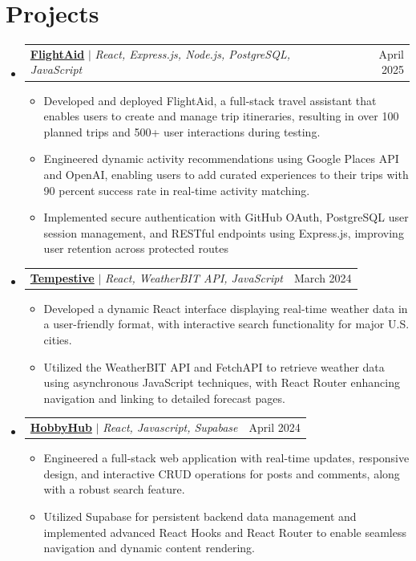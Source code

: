 \documentclass[letterpaper,11pt]{article}
\makeatletter
\newcommand{\resumeItem}[1]{
  \item\small{
    {#1 \vspace{-2pt}}
  }
}
\newcommand{\resumeProjectHeading}[2]{
    \item
    \begin{tabular*}{0.97\textwidth}{l@{\extracolsep{\fill}}r}
      \small#1 & #2 \\
    \end{tabular*}\vspace{-7pt}
}
\newcommand{\resumeSubHeadingListStart}{\begin{itemize}[leftmargin=0.1in, label={}]}
\newcommand{\resumeSubHeadingListEnd}{\end{itemize}}
\newcommand{\resumeItemListStart}{\begin{itemize}}
\newcommand{\resumeItemListEnd}{\end{itemize}\vspace{-5pt}}
\makeatother
\begin{document}
\section{Projects}
    \resumeSubHeadingListStart
      \resumeProjectHeading
          {{\textbf{\href{https://github.com/nestor-remo/FlightAid}{FlightAid}}} $|$ \emph{React, Express.js, Node.js, PostgreSQL, JavaScript}} {April 2025}
          \resumeItemListStart
              \resumeItem{Developed and deployed FlightAid, a full-stack travel assistant that enables users to create and manage trip itineraries, resulting in over 100 planned trips and 500+ user interactions during testing.}
              \resumeItem{Engineered dynamic activity recommendations using Google Places API and OpenAI, enabling users to add curated experiences to their trips with 90 percent success rate in real-time activity matching.}
              \resumeItem{Implemented secure authentication with GitHub OAuth, PostgreSQL user session management, and RESTful endpoints using Express.js, improving user retention across protected routes}
          \resumeItemListEnd
      \resumeProjectHeading
          {{\textbf{\href{https://github.com/nestor-remo/WeatherAPI}{Tempestive}}} $|$ \emph{React, WeatherBIT API, JavaScript}} {March 2024}
          \resumeItemListStart
            \resumeItem{Developed a dynamic React interface displaying real-time weather data in a user-friendly format, with interactive search functionality for major U.S. cities.}
            \resumeItem{Utilized the WeatherBIT API and FetchAPI to retrieve weather data using asynchronous JavaScript techniques, with React Router enhancing navigation and linking to detailed forecast pages.}
          \resumeItemListEnd
      \resumeProjectHeading
          {{\textbf{\href{https://hubhobby.netlify.app/}{HobbyHub}}} $|$ \emph{React, Javascript, Supabase}} {April 2024}
          \resumeItemListStart
            \resumeItem{Engineered a full-stack web application with real-time updates, responsive design, and interactive CRUD operations for posts and comments, along with a robust search feature.}
            \resumeItem{Utilized Supabase for persistent backend data management and implemented advanced React Hooks and React Router to enable seamless navigation and dynamic content rendering.}
          \resumeItemListEnd
            
    \resumeSubHeadingListEnd



\end{document}
